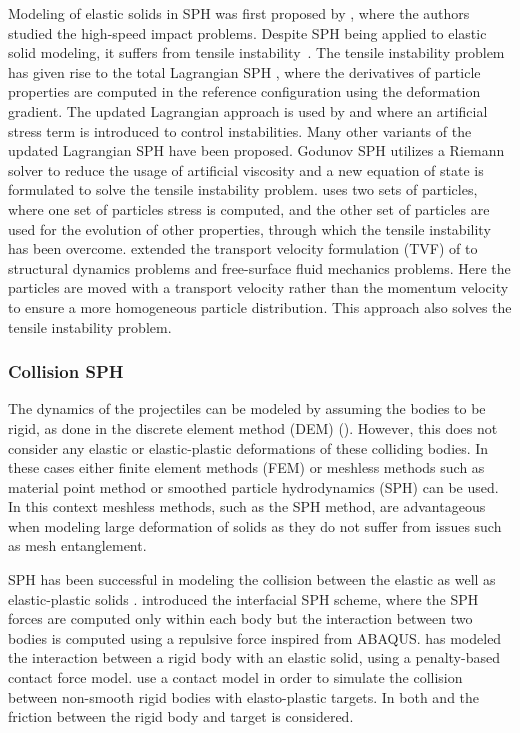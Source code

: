 Modeling of elastic solids in SPH was first proposed by
\cite{libersky1991smooth}, where the authors studied the high-speed impact
problems. Despite SPH being applied to elastic solid modeling, it suffers from
tensile instability~\citep{swegle1995smoothed}. The tensile instability problem
has given rise to the total Lagrangian SPH \citep{bonet2002alternative,
  vignjevic2006sph, belytschko2000unified}, where the derivatives of particle
properties are computed in the reference configuration using the deformation
gradient. The updated Lagrangian approach is used by \cite{gray2001sph} and
\cite{monaghan2000sph} where an artificial stress term is introduced to control
instabilities. Many other variants of the updated Lagrangian SPH have been
proposed. Godunov SPH \citep{sugiura2017extension} utilizes a Riemann solver to
reduce the usage of artificial viscosity and a new equation of state is
formulated to solve the tensile instability problem. \cite{dyka1995approach}
uses two sets of particles, where one set of particles stress is computed, and
the other set of particles are used for the evolution of other properties,
through which the tensile instability has been overcome.
\cite{zhang2017generalized} extended the transport velocity formulation (TVF) of
\cite{adami2013transport} to structural dynamics problems and free-surface fluid
mechanics problems. Here the particles are moved with a transport velocity
rather than the momentum velocity to ensure a more homogeneous particle
distribution. This approach also solves the tensile instability problem.


\subsubsection*{Collision SPH}
The dynamics of the projectiles can be modeled by assuming the bodies to be
rigid, as done in the discrete element method (DEM) (\citep{zhan2021surface}).
However, this does not consider any elastic or elastic-plastic deformations of
these colliding bodies. In these cases either finite element methods (FEM)
\citep{rodrigues2019elastic} or meshless methods such as material point
method\citep{sulsky1994particle} or smoothed particle hydrodynamics (SPH)
\citep{gingold1977smoothed} can be used. In this context meshless methods, such
as the SPH method, are advantageous when modeling large deformation of solids as
they do not suffer from issues such as mesh entanglement.

SPH has been successful in modeling the collision between the elastic as well as
elastic-plastic solids \citep{gray2001sph, cleary2010elastoplastic}.
\cite{yan2021simulation} introduced the interfacial SPH scheme, where the SPH
forces are computed only within each body but the interaction between two bodies
is computed using a repulsive force inspired from ABAQUS.
\cite{vyas2021collisional} has modeled the interaction between a rigid body with
an elastic solid, using a penalty-based contact force model.
\cite{mohseni2021particle} use a contact model in order to simulate the
collision between non-smooth rigid bodies with elasto-plastic targets. In both
\citep{vyas2021collisional} and \citep{mohseni2021particle} the friction between
the rigid body and target is considered.


